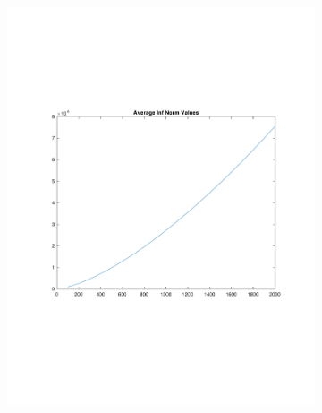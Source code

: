 \documentclass{article}
\begin{document}
\begin{figure}[H]
\begin{subfigure}{0.48\textwidth}
\includegraphics[width=\linewidth]{inf}
\end{subfigure}\hspace*{\fill}
\begin{subfigure}{0.48\textwidth}

\end{subfigure}
\end{figure}
\end{document}
